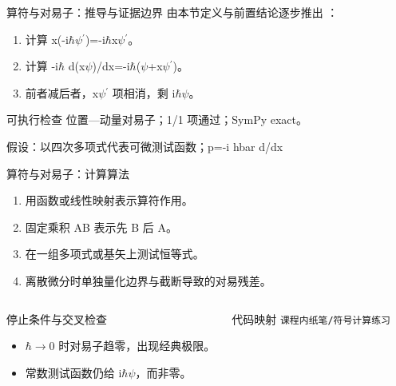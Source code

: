 \begin{frame}[t]{算符与对易子：推导与证据边界}
\footnotesize
{}\quad 由本节定义与前置结论逐步推出 ：
\begin{enumerate}
\item 计算 x(-i\ensuremath{\hbar}\ensuremath{\psi}\ensuremath{^{\prime}})=-i\ensuremath{\hbar}x\ensuremath{\psi}\ensuremath{^{\prime}}。
\item 计算 -i\ensuremath{\hbar} d(x\ensuremath{\psi})/\allowbreak{}dx=-i\ensuremath{\hbar}(\ensuremath{\psi}+x\ensuremath{\psi}\ensuremath{^{\prime}})。
\item 前者减后者，x\ensuremath{\psi}\ensuremath{^{\prime}} 项相消，剩 i\ensuremath{\hbar}\ensuremath{\psi}。
\end{enumerate}\begin{block}{可执行检查}
\quad 位置—动量对易子；1/1 项通过；SymPy exact。
\par\scriptsize 假设：以四次多项式代表可微测试函数；p=-i hbar d/\allowbreak{}dx
\end{block}
\end{frame}

\begin{frame}[t]{算符与对易子：计算算法}
\footnotesize
{}\begin{enumerate}
\item 用函数或线性映射表示算符作用。
\item 固定乘积 AB 表示先 B 后 A。
\item 在一组多项式或基矢上测试恒等式。
\item 离散微分时单独量化边界与截断导致的对易残差。
\end{enumerate}\begin{columns}[T,onlytextwidth]
\begin{block}{停止条件与交叉检查}\scriptsize\begin{itemize}
\item[\CheckMark] \ensuremath{\hbar}\ensuremath{\rightarrow}0 时对易子趋零，出现经典极限。
\item[\CheckMark] 常数测试函数仍给 i\ensuremath{\hbar}\ensuremath{\psi}，而非零。
\end{itemize}\end{block}
\begin{block}{代码映射}
\scriptsize \texttt{课程内纸笔/\allowbreak{}符号计算练习}
\end{block}\end{columns}\end{frame}

